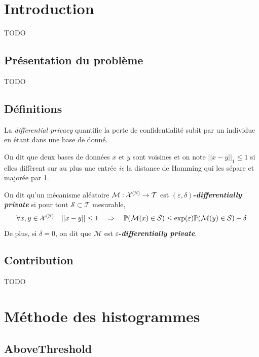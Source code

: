 \section{Introduction}
TODO

\subsection{Présentation du problème}

TODO

\subsection{Définitions}

La \textit{differential privacy} \cite{10.1007/11681878_14} quantifie la perte de confidentialité subit par un individue en étant dans une base de donné. \\


On dit que deux bases de données \(x\) et \(y\) sont voisines et on note \(||x - y||_1 \leq 1\) si elles diffèrent sur au plus une entrée \textit{ie} la distance de {\sc Hamming} qui les sépare et majorée par 1.\\


On dit qu'un mécanisme aléatoire \(\mathcal M :\mathcal X^{(\mathbb{N})} \to \mathcal T\) est \textbf{\((\varepsilon, \delta)\)-\textit{differentially private}} si pour tout \(\mathcal S \subset \mathcal T \) mesurable, 
\[
    \forall x,y \in \mathcal X^{(\mathbb{N})} \quad ||x - y|| \leq 1 \quad \Rightarrow \quad \mathbb P(\mathcal M(x) \in \mathcal S) \leq \exp(\varepsilon)  \mathbb P(\mathcal M(y) \in \mathcal S) + \delta
\] 
De plus, si \(\delta = 0\), on dit que \(\mathcal M\) est \textbf{\(\varepsilon\)-\textit{differentially private}}.\\


\subsection{Contribution}

TODO

\section{Méthode des histogrammes}

\subsection{AboveThreshold}

